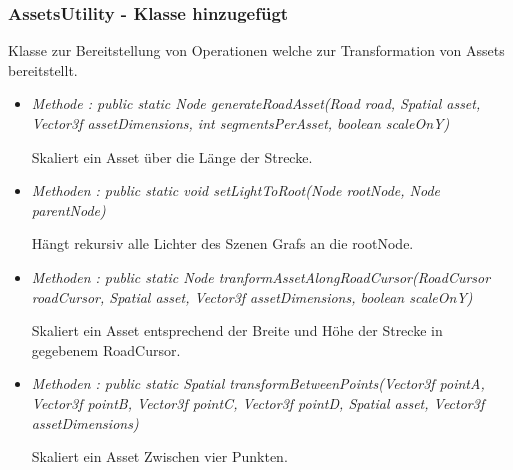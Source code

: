 \subsubsection{AssetsUtility - Klasse hinzugefügt}
Klasse zur Bereitstellung von Operationen welche zur Transformation von Assets bereitstellt.
\begin{itemize}
    \item \textit{Methode : public static Node generateRoadAsset(Road road, Spatial asset, Vector3f assetDimensions, int segmentsPerAsset, boolean scaleOnY)}
        \begin{leftbar}[0.9\linewidth]
            Skaliert ein Asset über die Länge der Strecke.\par
        \end{leftbar}
    \item \textit{Methoden : public static void setLightToRoot(Node rootNode, Node parentNode)}
        \begin{leftbar}[0.9\linewidth]
            Hängt rekursiv alle Lichter des Szenen Grafs an die rootNode.\par
        \end{leftbar}
    \item \textit{Methoden : public static Node tranformAssetAlongRoadCursor(RoadCursor roadCursor, Spatial asset,
        Vector3f assetDimensions, boolean scaleOnY)}
        \begin{leftbar}[0.9\linewidth]
            Skaliert ein Asset entsprechend der Breite und Höhe der Strecke in gegebenem RoadCursor.\par
        \end{leftbar}
    \item \textit{Methoden : public static Spatial transformBetweenPoints(Vector3f pointA, Vector3f pointB,
    Vector3f pointC, Vector3f pointD, Spatial asset, Vector3f assetDimensions)}
        \begin{leftbar}[0.9\linewidth]
            Skaliert ein Asset Zwischen vier Punkten.\par
        \end{leftbar}
\end{itemize}